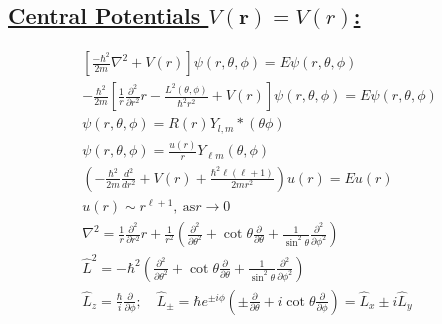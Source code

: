 \documentclass[a4paper,12pt]{article}
\begin{document}
\subsection*{\underline{Central Potentials $V(\mathbf{r})=V(r)$:}}
\begin{gather}
    \left[ \frac{-\hbar^2}{2m}\nabla^2+V(r) \right]\psi(r,\theta,\phi)=E\psi(r,\theta,\phi)\\
    -\frac{\hbar^2}{2m}\left[ \frac{1}{r}\frac{\partial^2}{\partial r^2}r- \frac{L^2(\theta,\phi)}{\hbar^2r^2}+V(r)\right]\psi(r,\theta,\phi)=E\psi(r,\theta,\phi)\\
    \psi(r, \theta, \phi)=R(r)Y_{l,m}*(\theta\phi)\\
    \psi(r, \theta, \phi)=\frac{u(r)}{r} Y_{\ell m}(\theta, \phi)\\
    \left(-\frac{\hbar^{2}}{2 m} \frac{d^{2}}{d r^{2}}+V(r)+\frac{\hbar^{2} \ell(\ell+1)}{2 m r^{2}}\right) u(r)=E u(r)\\
    u(r) \sim r^{\ell+1},\ \mathrm{as} r \rightarrow 0\\
    \nabla^{2}=\frac{1}{r} \frac{\partial^{2}}{\partial r^{2}} r+\frac{1}{r^{2}}\left(\frac{\partial^{2}}{\partial \theta^{2}}+\cot \theta \frac{\partial}{\partial \theta}+\frac{1}{\sin ^{2} \theta} \frac{\partial^{2}}{\partial \phi^{2}}\right) \\
    \hat{L}^{2}=-\hbar^{2}\left(\frac{\partial^{2}}{\partial \theta^{2}}+\cot \theta \frac{\partial}{\partial \theta}+\frac{1}{\sin ^{2} \theta} \frac{\partial^{2}}{\partial \phi^{2}}\right) \\
    \hat{L}_{z}=\frac{\hbar}{i} \frac{\partial}{\partial \phi} ; \quad \hat{L}_{\pm}=\hbar e^{\pm i \phi}\left(\pm \frac{\partial}{\partial \theta}+i \cot \theta \frac{\partial}{\partial \phi}\right)=\hat{L}_{x}\pm i\hat{L}_{y}
\end{gather}
\end{document}
